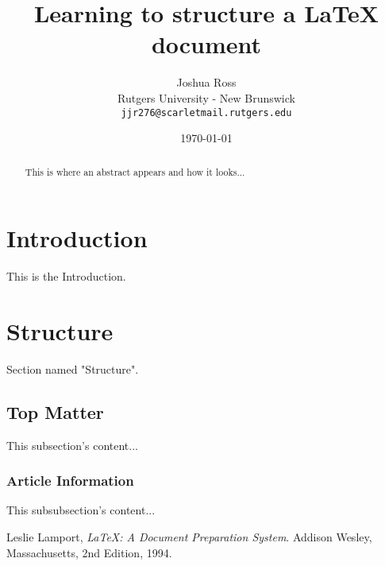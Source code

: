 \documentclass{article}
\begin{document}
\title{Learning to structure a \LaTeX{} document}

\author{Joshua Ross\\
	Rutgers University - New Brunswick\\
	\texttt{jjr276@scarletmail.rutgers.edu}}

\date{\today}

\maketitle

\begin{abstract}
This is where an abstract appears and how it looks...
\end{abstract}


\section{Introduction}
This is the Introduction.

\section{Structure}
Section named "Structure".

\subsection{Top Matter}
This subsection's content...

\subsubsection{Article Information}
This subsubsection's content... 

\clearpage

\begin{thebibliography}{9}
	  Leslie Lamport,
	  \emph{\LaTeX: A Document Preparation System}.
	  Addison Wesley, Massachusetts,
	  2nd Edition,
	  1994.

\end{thebibliography}
\end{document}
